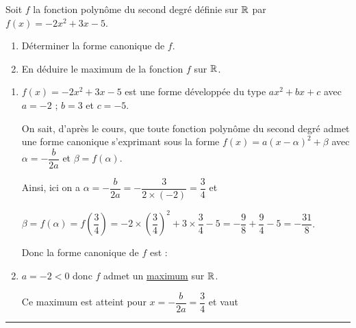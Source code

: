 \documentclass[a4paper,11pt]{article}
\begin{document}

\setcounter{page}{1}
\leavevmode\exerciceR 

Soit $f$ la fonction polynôme du second degré définie sur $\mathbb{R}$ par $f(x)=-2x^2+3x-5$.
\begin{enumerate}
\item Déterminer la forme canonique de $f$.
\item En déduire le maximum de la fonction $f$ sur $\mathbb{R}$.
\end{enumerate}

\leavevmode\corrmethode

\begin{enumerate}
\item $f(x)=-2x^2+3x-5$ est une forme développée du type $ax^2+bx+c$ avec $a=-2$ ; $b=3$ et $c=-5$.

On sait, d'après le cours, que toute fonction polynôme du second degré admet une forme canonique s'exprimant sous la forme \boldmath $f(x)=a(x-\alpha)^2+\beta$  \unboldmath avec $\alpha=-\dfrac{b}{2a}$ et $\beta=f(\alpha)$.

\begin{minipage}{0.6\textwidth}
Ainsi, ici on a $\alpha=-\dfrac{b}{2a}=-\dfrac{3}{2\times (-2)}=\dfrac{3}{4}$ et

$\beta=f(\alpha)=f\left(\dfrac{3}{4}\right)=-2\times\left(\dfrac{3}{4}\right)^2+3\times\dfrac{3}{4}-5 =-\dfrac{9}{8}+\dfrac{9}{4}-5=-\dfrac{31}{8}$.

Donc la forme canonique de $f$ est : 
\end{minipage}
\hfill{}

\item $a=-2<0$ donc $f$ admet un \underline{maximum} sur $\mathbb{R}$.

Ce maximum est atteint pour $x=-\dfrac{b}{2a}=\dfrac{3}{4}$ et vaut 
\end{enumerate}

\rule{\textwidth}{0.7pt}
\end{document}
